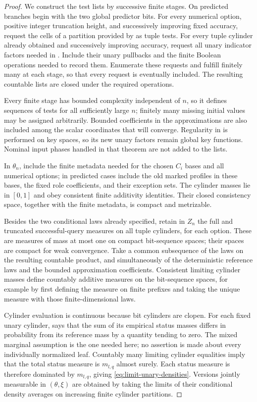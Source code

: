 \begin{proof}
We construct the test lists by successive finite stages. On predicted
branches begin with the two global predictor bits. For every numerical
option, positive integer truncation height, and successively improving
fixed accuracy, request the cells of a partition provided by
 as tuple tests. For every tuple
cylinder already obtained and successively improving accuracy, request
all unary indicator factors needed in . Include
their unary pullbacks and the finite Boolean operations needed to record
them. Enumerate these requests and fulfill finitely many at each stage,
so that every request is eventually included. The resulting countable
lists are closed under the required operations.

Every finite stage has bounded complexity independent of $n$, so it
defines sequences of tests for all sufficiently large $n$; finitely many
missing initial values may be assigned arbitrarily. Bounded coefficients
in the approximations are also included among the scalar coordinates
that will converge. Regularity in  is performed
on key spaces, so its new unary factors remain global key functions.
Nominal input phases handled in that theorem are not added to the lists.

In $\theta_n$, include the finite metadata needed for the chosen $C_i$
bases and all numerical options; in predicted cases include the old
marked profiles in these bases, the fixed role coefficients, and their
exception sets. The cylinder masses lie in $[0,1]$ and obey consistent
finite additivity identities. Their closed consistency space, together
with the finite metadata, is compact and metrizable.

Besides the two conditional laws already specified, retain in $Z_n$ the
full and truncated successful-query measures on all tuple cylinders,
for each option. These are measures of mass at most one on compact
bit-sequence spaces; their spaces are compact for weak convergence.
Take a common subsequence of the laws on the resulting countable
product, and simultaneously of the deterministic reference laws and
the bounded approximation coefficients. Consistent limiting cylinder
masses define countably additive measures on the bit-sequence spaces,
for example by first defining the measure on finite prefixes and taking
the unique measure with those finite-dimensional laws.

Cylinder evaluation is continuous because bit cylinders are clopen.
For each fixed unary cylinder,  says that the sum
of its empirical status masses differs in probability from its reference
mass by a quantity tending to zero. The mixed marginal assumption is
the one needed here; no assertion is made about every individually
normalized leaf. Countably many limiting cylinder equalities imply that
the total status measure is $m_{l,q}$ almost surely. Each status measure
is therefore dominated by $m_{l,q}$, giving
\eqref{eq:limit-unary-densities}. Versions jointly measurable in
$(\theta,\xi)$ are obtained by taking the limits of their conditional
density averages on increasing finite cylinder partitions.


\end{proof}
